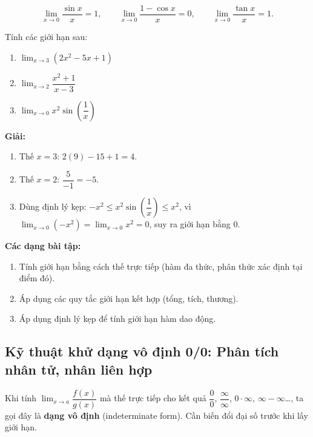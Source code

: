 \documentclass[12pt,a4paper]{article}
\begin{document}
\begin{congthuc}[title={Giới hạn lượng giác quan trọng}]
  \[
    \lim_{x \to 0} \dfrac{\sin x}{x} = 1, \qquad
    \lim_{x \to 0} \dfrac{1 - \cos x}{x} = 0, \qquad
    \lim_{x \to 0} \dfrac{\tan x}{x} = 1.
  \]
\end{congthuc}

\begin{vidu}
  Tính các giới hạn sau:
  \begin{enumerate}[label=(\alph*)]
    \item $\displaystyle\lim_{x \to 3} (2x^2 - 5x + 1)$
    \item $\displaystyle\lim_{x \to 2} \dfrac{x^2 + 1}{x - 3}$
    \item $\displaystyle\lim_{x \to 0} x^2 \sin\!\left(\dfrac{1}{x}\right)$
  \end{enumerate}

  \medskip\textbf{Giải:}
  \begin{enumerate}[label=(\alph*)]
    \item Thế $x = 3$: $2(9) - 15 + 1 = 4$.
    \item Thế $x = 2$: $\dfrac{5}{-1} = -5$.
    \item Dùng định lý kẹp: $-x^2 \le x^2\sin\!\left(\dfrac{1}{x}\right) \le x^2$, vì $\lim_{x\to 0}(-x^2) = \lim_{x\to 0} x^2 = 0$, suy ra giới hạn bằng $0$.
  \end{enumerate}
\end{vidu}

\medskip\noindent\textbf{Các dạng bài tập:}
\begin{enumerate}[label=\textbf{Dạng \arabic*:}, leftmargin=*, align=left]
  \item Tính giới hạn bằng cách thế trực tiếp (hàm đa thức, phân thức xác định tại điểm đó).
  \item Áp dụng các quy tắc giới hạn kết hợp (tổng, tích, thương).
  \item Áp dụng định lý kẹp để tính giới hạn hàm dao động.
\end{enumerate}

\subsection{Kỹ thuật khử dạng vô định 0/0: Phân tích nhân tử, nhân liên hợp}

\begin{dinhnghia}[title={Dạng vô định}]
  Khi tính $\displaystyle\lim_{x \to a} \dfrac{f(x)}{g(x)}$ mà thế trực tiếp cho kết quả $\dfrac{0}{0}$, $\dfrac{\infty}{\infty}$, $0 \cdot \infty$, $\infty - \infty$\ldots, ta gọi đây là \textbf{dạng vô định} (indeterminate form). Cần biến đổi đại số trước khi lấy giới hạn.
\end{dinhnghia}
\end{document}
